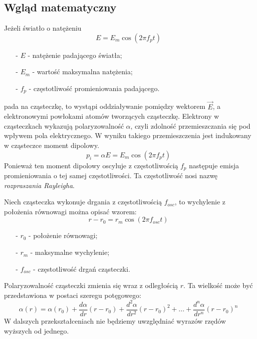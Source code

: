 \subsection{Wgląd matematyczny}
Jeżeli światło o natężeniu 
\begin{equation}
	E = E_{m}\cos (2\pi f_{p}t)
\end{equation}
\begin{itemize}
	\item[-]{$E$ - natężenie padającego światła};
	\item[-]{$E_{m}$ - wartość maksymalna natężenia};
	\item[-]{$f_{p}$ - częstotliwość promieniowania padającego}.
\end{itemize}
pada na cząsteczkę, to wystąpi oddziaływanie pomiędzy wektorem $\overrightarrow{E}$, a elektronowymi powłokami atomów tworzących cząsteczkę.
Elektrony w cząsteczkach wykazują polaryzowalność $\alpha$, czyli zdolność przemieszczania
się pod wpływem pola elektrycznego. W wyniku takiego przemieszczenia jest indukowany w cząsteczce moment dipolowy.
\begin{equation}
	p_{i} = \alpha E = E_{m}\cos (2\pi f_{p}t)
\end{equation}
Ponieważ ten moment dipolowy oscyluje z częstotliwością $f_{p}$ następuje emisja promieniowania o tej samej częstotliwości. Ta częstotliwość nosi nazwę 
\textit{rozpraszania Rayleigha}.

Niech cząsteczka wykonuje drgania z częstotliwością $f_{osc}$, to wychylenie z położenia 
równowagi można opisać wzorem:
\begin{equation}
	r - r_{0} = r_{m}\cos (2\pi f_{osc}t)
\end{equation}
\begin{itemize}
	\item[-]{$r_{0}$ - położenie równowagi};
	\item[-]{$r_{m}$ - maksymalne wychylenie};
	\item[-]{$f_{osc}$ - częstotliwość drgań cząsteczki}.
\end{itemize}
Polaryzowalność cząsteczki zmienia się wraz z odległością $r$. Ta wielkość może być
przedstawiona w postaci szeregu potęgowego:
\begin{equation}
	\alpha(r) = \alpha(r_{0}) + \frac{d\alpha}{dr}(r - r_{0}) + 
	\frac{d^{2}\alpha}{dr^{2}}(r - r_{0})^{2} + ... +
	\frac{d^{n}\alpha}{dr^{n}}(r - r_{0})^{n}
\end{equation}
W dalszych przekształceniach nie będziemy uwzględniać wyrazów rzędów wyższych od jednego. 

